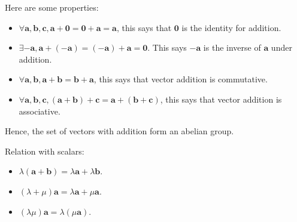 \documentclass[10pt]{article}
\begin{document}
    Here are some properties:
    \begin{itemize}
        \item $ \forall \mathbf{a}, \mathbf{b}, \mathbf{c}, \mathbf{a}+\mathbf{0}=\mathbf{0}+\mathbf{a}=\mathbf{a} $, this says that $ \mathbf{0} $ is the identity for addition.
        \item $ \exists -\mathbf{a}, \mathbf{a}+(-\mathbf{a})=(-\mathbf{a})+\mathbf{a}=\mathbf{0} $. This says $ -\mathbf{a} $ is the inverse of $ \mathbf{a} $ under addition.
        \item $ \forall \mathbf{a},\mathbf{b}, \mathbf{a}+\mathbf{b}=\mathbf{b}+\mathbf{a} $, this says that vector addition is commutative.
        \item $ \forall \mathbf{a},\mathbf{b},\mathbf{c}, (\mathbf{a}+\mathbf{b})+\mathbf{c}=\mathbf{a}+(\mathbf{b}+\mathbf{c}) $, this says that vector addition is associative.
    \end{itemize}
    Hence, the set of vectors with addition form an abelian group.

    Relation with scalars:
    \begin{itemize}
        \item $ \lambda(\mathbf{a}+\mathbf{b})=\lambda \mathbf{a}+\lambda \mathbf{b} $.
        \item $ (\lambda+\mu)\mathbf{a}=\lambda \mathbf{a}+ \mu \mathbf{a} $.
        \item $ (\lambda \mu)\mathbf{a}=\lambda(\mu \mathbf{a}) $.
    \end{itemize}
\end{document}
